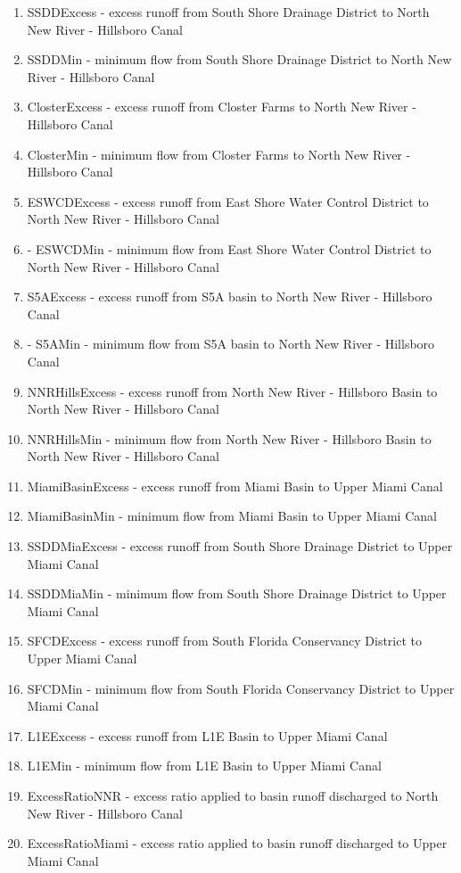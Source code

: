 \begin{enumerate}
 \item SSDDExcess \-- excess runoff from South Shore Drainage District
   to North New River \-- Hillsboro Canal
 \item SSDDMin \-- minimum flow from South Shore Drainage District to
   North New River \-- Hillsboro Canal
 \item ClosterExcess \-- excess runoff from Closter Farms to North New
   River \-- Hillsboro Canal
 \item ClosterMin \-- minimum flow from Closter Farms to North New River \--
   Hillsboro Canal
 \item ESWCDExcess \-- excess runoff from East Shore Water Control
   District to North New River \-- Hillsboro Canal
 \item \-- ESWCDMin \-- minimum flow from East Shore Water Control
   District to North New River \-- Hillsboro Canal
 \item S5AExcess \-- excess runoff from S5A basin to North New River
   \-- Hillsboro Canal
 \item \-- S5AMin \-- minimum flow from S5A basin to North New River
   \-- Hillsboro Canal
 \item NNRHillsExcess \-- excess runoff from North New River \-- Hillsboro
   Basin to North New River \-- Hillsboro Canal
 \item NNRHillsMin \-- minimum flow from North New River \-- Hillsboro
   Basin to North New River \-- Hillsboro Canal
 \item MiamiBasinExcess \-- excess runoff from Miami Basin to Upper
   Miami Canal
 \item MiamiBasinMin \-- minimum flow from Miami Basin to Upper Miami
   Canal
 \item SSDDMiaExcess \-- excess runoff from South Shore Drainage
   District to Upper Miami Canal
 \item SSDDMiaMin \-- minimum flow from South Shore Drainage District
   to Upper Miami Canal
 \item SFCDExcess \-- excess runoff from South Florida Conservancy
   District to Upper Miami Canal
 \item SFCDMin \-- minimum flow from South Florida Conservancy
   District to Upper Miami Canal
 \item L1EExcess \-- excess runoff from L1E Basin to Upper Miami Canal
 \item L1EMin \-- minimum flow from L1E Basin to Upper Miami Canal
 \item ExcessRatioNNR \-- excess ratio applied to basin runoff
   discharged to North New River \-- Hillsboro Canal
 \item ExcessRatioMiami \-- excess ratio applied to basin runoff
   discharged to Upper Miami Canal
\end{enumerate}


